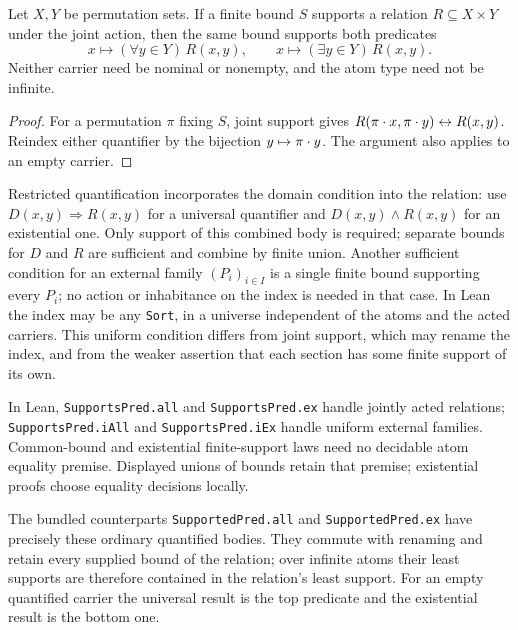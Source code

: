\begin{proposition}
\label{prop:predicate-quantification}
Let $X,Y$ be permutation sets. If a finite bound $S$ supports a relation
$R\subseteq X\times Y$ under the joint action, then the same bound supports
both predicates
\[
  x\longmapsto (\forall y\in Y)\,R(x,y),
  \qquad
  x\longmapsto (\exists y\in Y)\,R(x,y).
\]
Neither carrier need be nominal or nonempty, and the atom type need not be
infinite.
\end{proposition}

\begin{proof}
For a permutation $\pi$ fixing $S$, joint support gives
$R(\pi\mathbin{\cdot} x,\pi\mathbin{\cdot} y)\leftrightarrow R(x,y)$.
Reindex either quantifier by the bijection $y\mapsto\pi\mathbin{\cdot} y$.
The argument also applies to an empty carrier.
\end{proof}

Restricted quantification incorporates the domain condition into the relation:
use $D(x,y)\Rightarrow R(x,y)$ for a universal quantifier and
$D(x,y)\wedge R(x,y)$ for an existential one. Only support of this combined
body is required; separate bounds for $D$ and $R$ are sufficient and combine
by finite union. Another sufficient condition for an external
family $(P_i)_{i\in I}$ is a single finite bound supporting every $P_i$;
no action or inhabitance on the index is needed in that case. In Lean the
index may be any \texttt{Sort}, in a universe independent of the atoms and
the acted carriers. This uniform condition
differs from joint support, which may rename the index, and from the weaker
assertion that each section has some finite support of its own.

In Lean, \texttt{SupportsPred.all} and \texttt{SupportsPred.ex} handle jointly
acted relations; \texttt{SupportsPred.iAll} and \texttt{SupportsPred.iEx} handle
uniform external families. Common-bound and existential finite-support laws
need no decidable atom equality premise. Displayed unions of bounds retain
that premise; existential proofs choose equality decisions locally.

The bundled counterparts \texttt{SupportedPred.all} and
\texttt{SupportedPred.ex} have precisely these ordinary quantified bodies.
They commute with renaming and retain every supplied bound of the relation;
over infinite atoms their least supports are therefore contained in the
relation's least support. For an empty quantified carrier the universal
result is the top predicate and the existential result is the bottom one.

